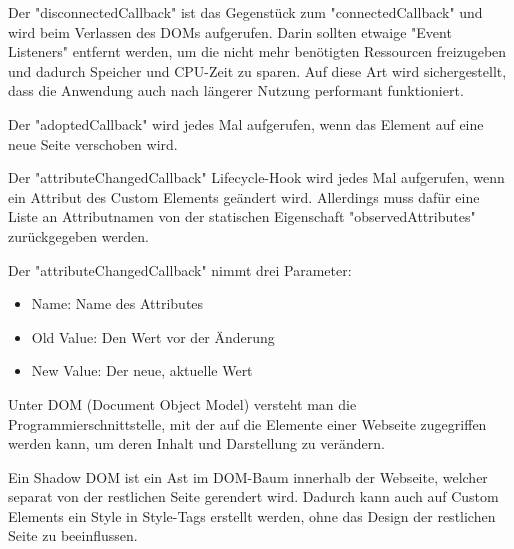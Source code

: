   
Der "{\ttfamily disconnectedCallback}" ist das Gegenstück zum "{\ttfamily connectedCallback}" und wird beim Verlassen des DOMs aufgerufen. Darin sollten etwaige "Event Listeners" entfernt werden, um die nicht mehr benötigten Ressourcen freizugeben und dadurch Speicher und CPU-Zeit zu sparen. 
Auf diese Art wird sichergestellt, dass die Anwendung auch nach längerer Nutzung performant funktioniert. \cite{MDNWebCustomElements}


Der "{\ttfamily adoptedCallback}" wird jedes Mal aufgerufen, wenn das Element auf eine neue Seite verschoben wird. \cite{MDNWebCustomElements}


Der "{\ttfamily attributeChangedCallback}" Lifecycle-Hook wird jedes Mal aufgerufen, wenn ein Attribut des Custom Elements geändert wird. Allerdings muss dafür eine Liste an Attributnamen von der statischen Eigenschaft "{\ttfamily observedAttributes}" zurückgegeben werden. \cite{MDNWebCustomElements}
    
Der "{\ttfamily attributeChangedCallback}" nimmt drei Parameter\cite{MDNWebCustomElements}:
\begin{itemize}
    \item Name: Name des Attributes
    \item Old Value: Den Wert vor der Änderung
    \item New Value: Der neue, aktuelle Wert 
\end{itemize}


\pagebreak
{}

Unter DOM (Document Object Model) versteht man die Programmierschnittstelle, mit der auf die Elemente einer Webseite zugegriffen werden kann, um deren Inhalt und Darstellung zu verändern. \cite{MDNDOM}

Ein Shadow DOM ist ein Ast im DOM-Baum innerhalb der Webseite, welcher separat von der restlichen Seite gerendert wird.
Dadurch kann auch auf Custom Elements ein Style in Style-Tags erstellt werden, ohne das Design der restlichen Seite zu beeinflussen. \cite{MDNShadowRoot}

